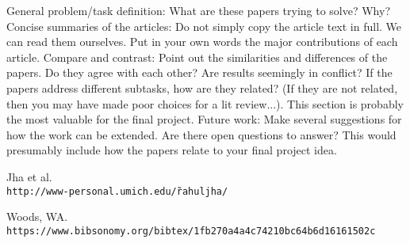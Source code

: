 \documentclass[a4paper]{article}
\theoremstyle{definition}
\begin{document}
    General problem/task definition: What are these papers trying to solve? Why?
    Concise summaries of the articles: Do not simply copy the article text in full. We can read them ourselves. Put in your own words the major contributions of each article.
    Compare and contrast: Point out the similarities and differences of the papers. Do they agree with each other? Are results seemingly in conflict? If the papers address different subtasks, how are they related? (If they are not related, then you may have made poor choices for a lit review...). This section is probably the most valuable for the final project.
    Future work: Make several suggestions for how the work can be extended. Are there open questions to answer? This would presumably include how the papers relate to your final project idea.

{\small

% 
\begin{thebibliography}{9}
    Jha et al.
    \\\texttt{http://www-personal.umich.edu/\~rahuljha/}

    Woods, WA.
    \\\texttt{https://www.bibsonomy.org/bibtex/1fb270a4a4c74210bc64b6d16161502c}
\end{thebibliography}
}
\end{document}

